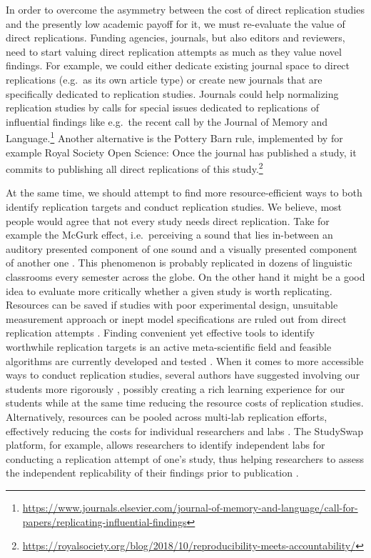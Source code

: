 \documentclass[cm,linguex]{glossa}
\begin{document}
In order to overcome the asymmetry between the cost of direct replication studies and the presently low academic payoff for it, we must re-evaluate the value of direct replications. Funding agencies, journals, but also editors and reviewers, need to start valuing direct replication attempts as much as they value novel findings. For example, we could either dedicate existing journal space to direct replications (e.g.~as its own article type) or create new journals that are specifically dedicated to replication studies.
Journals could help normalizing replication studies by calls for special issues dedicated to replications of influential findings like e.g.~the recent call by the Journal of Memory and Language.\footnote{\url{https://www.journals.elsevier.com/journal-of-memory-and-language/call-for-papers/replicating-influential-findings}}
Another alternative is the Pottery Barn rule, implemented by for example Royal Society Open Science: Once the journal has published a study, it commits to publishing all direct replications of this study.\footnote{ \url{https://royalsociety.org/blog/2018/10/reproducibility-meets-accountability/}}

At the same time, we should attempt to find more resource-efficient ways to both identify replication targets and conduct replication studies. We believe, most people would agree that not every study needs direct replication. Take for example the McGurk effect, i.e.~perceiving a sound that lies in-between an auditory presented component of one sound and a visually presented component of another one \citep{mcgurk1976hearing}. This phenomenon is probably replicated in dozens of linguistic classrooms every semester across the globe.
On the other hand it might be a good idea to evaluate more critically whether a given study is worth replicating. Resources can be saved if studies with poor experimental design, unsuitable measurement approach or inept model specifications are ruled out from direct replication attempts \citep{yarkoni2019generalizability}.
Finding convenient yet effective tools to identify worthwhile replication targets is an active meta-scientific field \citep[e.g.,][]{coles2018costs, isager2021deciding, hardwicke2018bayesian} and feasible algorithms are currently developed and tested \citep{isager2021replication}.
When it comes to more accessible ways to conduct replication studies, several authors have suggested involving our students more rigorously \citep[e.g.,][]{de2019using, frank2012teaching, grahe2012harnessing, roettger_toward_2019}, possibly creating a rich learning experience for our students while at the same time reducing the resource costs of replication studies. Alternatively, resources can be pooled across multi-lab replication efforts, effectively reducing the costs for individual researchers and labs \citep[e.g.,][]{frank2017collaborative, nieuwland_large-scale_2018, open_science_collaboration_estimating_2015}. The StudySwap platform, for example, allows researchers to identify independent labs for conducting a replication attempt of one's study, thus helping researchers to assess the independent replicability of their findings prior to publication \citep{chartier_studyswap_2018}.
\end{document}
